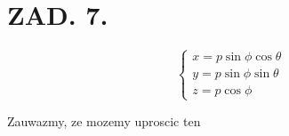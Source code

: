 \documentclass{article}[13pt]
\begin{document}
    \section*{ZAD. 7.}

    $$
        \begin{cases}
            x=p\sin\phi\cos\theta\\
            y=p\sin\phi\sin\theta\\
            z=p\cos\phi
        \end{cases}
    $$

    Zauwazmy, ze mozemy uproscic ten 
\end{document}
